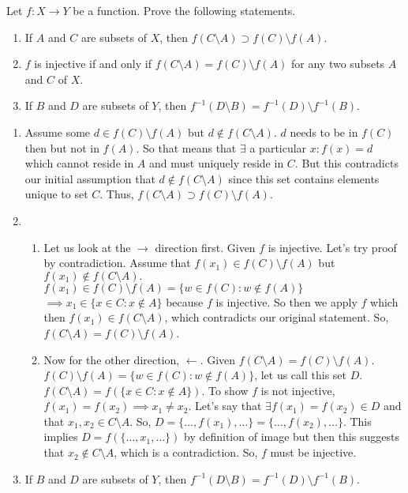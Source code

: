 \documentclass[12pt,letterpaper,boxed]{hmcpset}
\begin{document}
\begin{problem}[Exercise 3.6.]
Let $f: X \rightarrow Y$ be a function. Prove the following statements.
\vspace{-2mm}
\begin{enumerate}
	\itemsep0em
	\item If $A$ and $C$ are subsets of $X$, then $f(C\setminus A)\supset f(C)\setminus f(A)$.
	\item $f$ is injective if and only if $f(C\setminus A) = f(C)\setminus f(A)$ for any two subsets $A$ and $C$ of $X.$
	\item If $B$ and $D$ are subsets of $Y$, then $f^{-1}(D\setminus B)= f^{-1}(D)\setminus f^{-1}(B).$ 
\end{enumerate}
\end{problem}
\begin{solution}
\vspace{-2mm}
\begin{enumerate}
	\itemsep0em
	\item Assume some $d \in f(C)\setminus f(A)$ but $d \notin f(C\setminus A).$ $d$ needs to be in $f(C)$ then but not in $f(A).$ So that means that $\exists$ a particular $x : f(x)=d$ which cannot reside in $A$ and must uniquely reside in $C$. But this contradicts our initial assumption that $d \notin f(C\setminus A)$ since this set contains elements unique to set $C.$ Thus, $f(C\setminus A)\supset f(C)\setminus f(A)$. 
	\item 
		\begin{enumerate}
			\itemsep0em
		\item  Let us look at the $\rightarrow$ direction first. Given $f$ is injective. Let's try proof by contradiction. Assume that $f(x_1) \in f(C)\setminus f(A)$ but $f(x_1) \notin f(C\setminus A).$  $f(x_1) \in f(C)\setminus f(A) = \{w \in f(C) : w \notin f(A)\}$ $\implies x_1\in \{x\in C : x\notin A\}$ because $f$ is injective. So then we apply $f$ which then $f(x_1)\in f(C\setminus A)$, which contradicts our original statement. So, $f(C\setminus A) = f(C)\setminus f(A)$.
		\item Now for the other direction, $\leftarrow$. Given $f(C\setminus A) = f(C)\setminus f(A)$. $f(C)\setminus f(A)=\{w \in f(C) : w \notin f(A)\}$, let us call this set $D$. $f(C\setminus A)=f(\{x \in C : x \notin A\})$. To show $f$ is not injective, $f(x_1)=f(x_2) \implies x_1 \neq x_2$. Let's say that $\exists f(x_1)=f(x_2)\in D$ and that $x_1, x_2 \in C \setminus A$. So, $D=\{\dots,f(x_1),\dots\}=\{\dots,f(x_2),\dots\}.$ This implies $D=f(\{\dots,x_1,\dots\})$ by definition of image but then this suggests that $x_2 \notin C\setminus A$, which is a contradiction. So, $f$ must be injective. 
		\end{enumerate}
	\item If $B$ and $D$ are subsets of $Y$, then $f^{-1}(D\setminus B)= f^{-1}(D)\setminus f^{-1}(B).$
\end{enumerate}
\end{solution}
\end{document}
